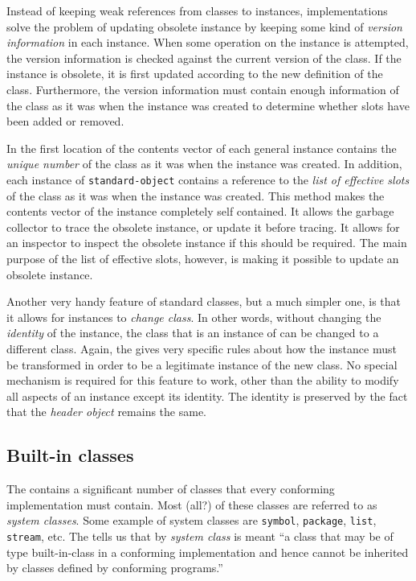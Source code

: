 Instead of keeping weak references from classes to instances,
implementations solve the problem of updating obsolete instance by
keeping some kind of \emph{version information} in each instance.
When some operation on the instance is attempted, the version
information is checked against the current version of the class.  If
the instance is obsolete, it is first updated according to the new
definition of the class.  Furthermore, the version information must
contain enough information of the class as it was when the instance
was created to determine whether slots have been added or removed.

In \sysname{} the first location of the contents vector of each general
instance contains the \emph{unique number} of the class as it was when
the instance was created.  In addition, each instance of
\texttt{standard-object} contains a reference to the \emph{list of
  effective slots} of the class as it was when the instance was
created.  This method makes the contents vector of the instance
completely self contained.  It allows the garbage collector to trace
the obsolete instance, or update it before tracing.  It allows for an
inspector to inspect the obsolete instance if this should be required.
The main purpose of the list of effective slots, however, is making it
possible to update an obsolete instance.

Another very handy feature of standard classes, but a much simpler
one, is that it allows for instances to \emph{change class}.  In other
words, without changing the \emph{identity} of the instance, the class
that is an instance of can be changed to a different class.  Again,
the \hs{} gives very specific rules about how the instance must be
transformed in order to be a legitimate instance of the new class.  No
special mechanism is required for this feature to work, other than the
ability to modify all aspects of an instance except its identity.  The
identity is preserved by the fact that the \emph{header object}
remains the same. 

\subsection{Built-in classes}
\label{object-system-built-in-classes}

The \hs{} contains a significant number of classes that every
conforming implementation must contain.  Most (all?) of these classes
are referred to as \emph{system classes}.  Some example of system
classes are \texttt{symbol}, \texttt{package}, \texttt{list},
\texttt{stream}, etc.  The \hs{} tells us that by \emph{system
  class} is meant ``a class that may be of type built-in-class in a
conforming implementation and hence cannot be inherited by classes
defined by conforming programs.'' 

